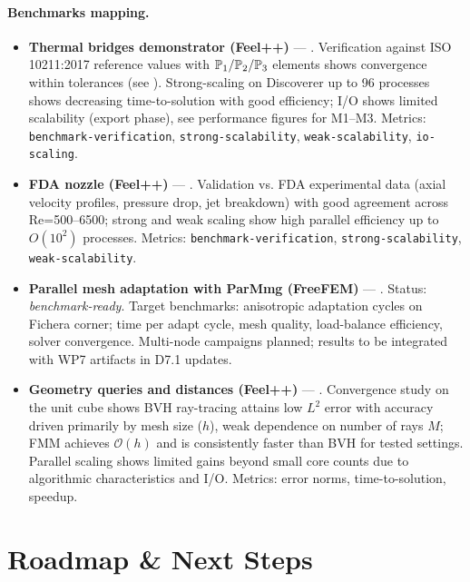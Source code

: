 \paragraph{Benchmarks mapping.}
\begin{itemize}
    \item \textbf{Thermal bridges demonstrator (Feel++)} — . Verification against ISO 10211:2017 reference values with $\mathbb{P}_1/\mathbb{P}_2/\mathbb{P}_3$ elements shows convergence within tolerances (see ). Strong-scaling on Discoverer up to 96 processes shows decreasing time-to-solution with good efficiency; I/O shows limited scalability (export phase), see performance figures for M1–M3. Metrics: \texttt{benchmark-verification}, \texttt{strong-scalability}, \texttt{weak-scalability}, \texttt{io-scaling}.
    \item \textbf{FDA nozzle (Feel++)} — . Validation vs. FDA experimental data (axial velocity profiles, pressure drop, jet breakdown) with good agreement across Re=500–6500; strong and weak scaling show high parallel efficiency up to $O(10^2)$ processes. Metrics: \texttt{benchmark-verification}, \texttt{strong-scalability}, \texttt{weak-scalability}.
    \item \textbf{Parallel mesh adaptation with ParMmg (FreeFEM)} — . Status: \emph{benchmark-ready}. Target benchmarks: anisotropic adaptation cycles on Fichera corner; time per adapt cycle, mesh quality, load-balance efficiency, solver convergence. Multi-node campaigns planned; results to be integrated with WP7 artifacts in D7.1 updates.
    \item \textbf{Geometry queries and distances (Feel++)} — . Convergence study on the unit cube shows BVH ray-tracing attains low $L^2$ error with accuracy driven primarily by mesh size ($h$), weak dependence on number of rays $M$; FMM achieves $\mathcal{O}(h)$ and is consistently faster than BVH for tested settings. Parallel scaling shows limited gains beyond small core counts due to algorithmic characteristics and I/O. Metrics: error norms, time-to-solution, speedup.
\end{itemize}

\section{Roadmap \& Next Steps}

